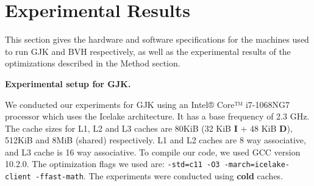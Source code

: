 \documentclass[twocolumn]{article}
\newcommand{\mypar}[1]{{\bf #1.}}
\begin{document}






\section{Experimental Results}\label{sec:exp}

This section gives the hardware and software specifications for the machines used to run GJK and BVH respectively, as well as the experimental results of the optimizations described in the Method section. 

\mypar{Experimental setup for GJK}

We conducted our experiments for GJK using an Intel® Core™ i7-1068NG7 processor which uses the Icelake architecture. It has a base frequency of 2.3 GHz. The cache sizes for L1, L2 and L3 caches are 80KiB (32 KiB \textbf{I} + 48 KiB \textbf{D}), 512KiB and 8MiB (shared) respectively. L1 and L2 caches are 8 way associative, and L3 cache is 16 way associative. To compile our code, we used GCC version 10.2.0. The optimization flags we used are: \texttt{-std=c11 -O3 -march=icelake-client -ffast-math}. The experiments were conducted using \textbf{cold} caches.
\end{document}
